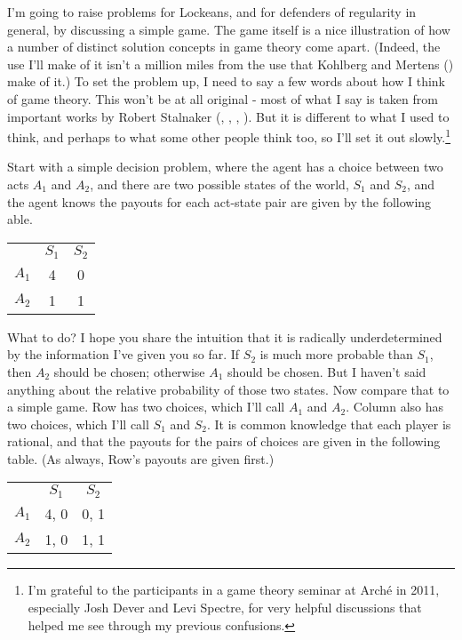 \documentclass[
  11pt,
  letterpaper,
  DIV=11,
  numbers=noendperiod,
  twoside]{scrartcl}
\begin{document}
I'm going to raise problems for Lockeans, and for defenders of
regularity in general, by discussing a simple game. The game itself is a
nice illustration of how a number of distinct solution concepts in game
theory come apart. (Indeed, the use I'll make of it isn't a million
miles from the use that Kohlberg and Mertens
() make of it.) To set the
problem up, I need to say a few words about how I think of game theory.
This won't be at all original - most of what I say is taken from
important works by Robert Stalnaker (,
, ,
). But it is different to what I used
to think, and perhaps to what some other people think too, so I'll set
it out slowly.\footnote{I'm grateful to the participants in a game
  theory seminar at Arché in 2011, especially Josh Dever and Levi
  Spectre, for very helpful discussions that helped me see through my
  previous confusions.}

Start with a simple decision problem, where the agent has a choice
between two acts \(A_1\) and \(A_2\), and there are two possible states
of the world, \(S_1\) and \(S_2\), and the agent knows the payouts for
each act-state pair are given by the following able.

\begin{longtable}[]{@{}lcc@{}}
\toprule\noalign{}
\endhead
\bottomrule\noalign{}
\endlastfoot
& \(S_1\) & \(S_2\) \\
\(A_1\) & 4 & 0 \\
\(A_2\) & 1 & 1 \\
\end{longtable}

What to do? I hope you share the intuition that it is radically
underdetermined by the information I've given you so far. If \(S_2\) is
much more probable than \(S_1\), then \(A_2\) should be chosen;
otherwise \(A_1\) should be chosen. But I haven't said anything about
the relative probability of those two states. Now compare that to a
simple game. Row has two choices, which I'll call \(A_1\) and \(A_2\).
Column also has two choices, which I'll call \(S_1\) and \(S_2\). It is
common knowledge that each player is rational, and that the payouts for
the pairs of choices are given in the following table. (As always, Row's
payouts are given first.)

\begin{longtable}[]{@{}lcc@{}}
\toprule\noalign{}
\endhead
\bottomrule\noalign{}
\endlastfoot
& \(S_1\) & \(S_2\) \\
\(A_1\) & 4, 0 & 0, 1 \\
\(A_2\) & 1, 0 & 1, 1 \\
\end{longtable}
\end{document}
